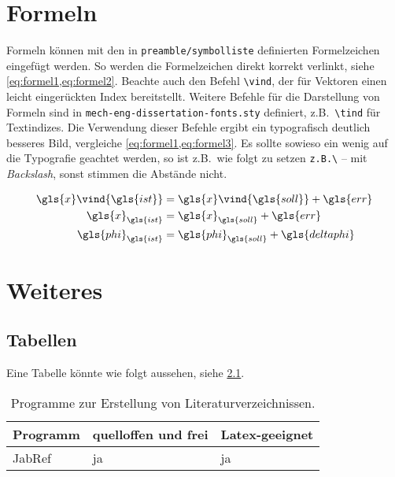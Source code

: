 
\chapter{Formeln} \label{sec:Formeln}

Formeln können mit den in \texttt{preamble/symbolliste} definierten Formelzeichen eingefügt werden. So werden die Formelzeichen direkt korrekt verlinkt, siehe \cref{eq:formel1,eq:formel2}. Beachte auch den Befehl \texttt{\textbackslash vind}, der für Vektoren einen leicht eingerückten Index bereitstellt. Weitere Befehle für die Darstellung von Formeln sind in \texttt{mech-eng-dissertation-fonts.sty} definiert, z.B.\ \texttt{\textbackslash tind} für Textindizes. Die Verwendung dieser Befehle ergibt ein typografisch deutlich besseres Bild, vergleiche \cref{eq:formel1,eq:formel3}. Es sollte sowieso ein wenig auf die Typografie geachtet werden, so ist z.B.\ wie folgt zu setzen \texttt{z.B.\textbackslash} -- mit \textit{Backslash}, sonst stimmen die Abstände nicht.

\begin{align}
	\label{eq:formel1}
	\gls{x}\vind{\gls{ist}} & = \gls{x}\vind{\gls{soll}} + \gls{err}    \\
	\label{eq:formel3}
	\gls{x}_{\gls{ist}}     & = \gls{x}_{\gls{soll}} + \gls{err}        \\
	\label{eq:formel2}
	\gls{phi}_{\gls{ist}}   & = \gls{phi}_{\gls{soll}} + \gls{deltaphi}
\end{align}

\blindtext[3]


\chapter{Weiteres}

\section{Tabellen}
\label{sec:HFS_Wahrnehmung}

Eine Tabelle könnte wie folgt aussehen, siehe \cref{tab:programme}.

\begin{table}[hbt]
	\centering
	\caption{Programme zur Erstellung von Literaturverzeichnissen.}
	\label{tab:programme}
	\begin{tabular}{lll}
		\toprule
		Programm & quelloffen und frei & Latex-geeignet \\ \midrule
		JabRef   & ja                  & ja             \\ \bottomrule
	\end{tabular}
\end{table}

